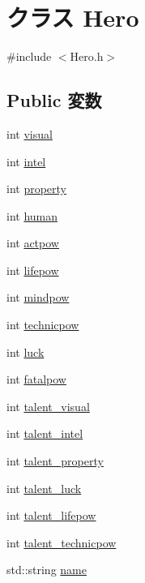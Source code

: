 \hypertarget{class_hero}{\section{クラス Hero}
\label{class_hero}
}


{\ttfamily \#include $<$Hero.\-h$>$}

\subsection*{Public 変数}
\begin{DoxyCompactItemize}
\item 
int \hyperlink{class_hero_a5f9ad5cdca801f5a50a061f4922efd7d}{visual}
\item 
int \hyperlink{class_hero_ab9573020c1704c9f43ab506432940b3b}{intel}
\item 
int \hyperlink{class_hero_a77d140b20f250b02097d3926857ab780}{property}
\item 
int \hyperlink{class_hero_aa5b6f464a1977614dbe6aaa57d18e92a}{human}
\item 
int \hyperlink{class_hero_a3f5b9c15c67f1633720c0697c2defe72}{actpow}
\item 
int \hyperlink{class_hero_a055d2c7f5e0086c118d1abb8536c36a7}{lifepow}
\item 
int \hyperlink{class_hero_ac0e4df7794def10a02d48c1e6dba9c5c}{mindpow}
\item 
int \hyperlink{class_hero_ad4835e0318acceb88198a8a8b11e6a71}{technicpow}
\item 
int \hyperlink{class_hero_a18a85e0df8fb262c9308ab871c2a41e3}{luck}
\item 
int \hyperlink{class_hero_a042bab3291db1aa87c63c99d4ec04afe}{fatalpow}
\item 
int \hyperlink{class_hero_a503facff977509d2d128b1f4fbadfc3d}{talent\-\_\-visual}
\item 
int \hyperlink{class_hero_a059bf1e0f90e5abf88fb7fa649e18f05}{talent\-\_\-intel}
\item 
int \hyperlink{class_hero_a18363568d19a059d64d5864788a04a85}{talent\-\_\-property}
\item 
int \hyperlink{class_hero_af98b757526fa6500d45f39a8a51ee2a8}{talent\-\_\-luck}
\item 
int \hyperlink{class_hero_a38bcfab7d64061895bbdae43693d07ec}{talent\-\_\-lifepow}
\item 
int \hyperlink{class_hero_ad70bb2fa210cd7b1d40f18a894a8b901}{talent\-\_\-technicpow}
\item 
std\-::string \hyperlink{class_hero_a26989c93944866e4f3b9c60cc8f47e0a}{name}
\end{DoxyCompactItemize}


